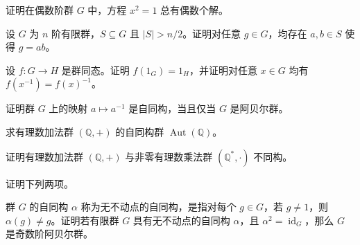 \noindent\begin{minipage}{\textwidth}
证明在偶数阶群 $G$ 中，方程 $x^{2}=1$ 总有偶数个解。
\end{minipage}\par\vfill
\newpage
\noindent\begin{minipage}{\textwidth}
设 $G$ 为 $n$ 阶有限群，$S\subseteq G$ 且 $|S|>n/2$。证明对任意 $g\in G$，均存在 $a,b\in S$ 使得 $g=ab$。
\end{minipage}\par\vfill
\noindent\begin{minipage}{\textwidth}
设 $f\colon G\to H$ 是群同态。证明 $f(1_G)=1_H$，并证明对任意 $x\in G$ 均有 $f(x^{-1})=f(x)^{-1}$。
\end{minipage}\par\vfill
\noindent\begin{minipage}{\textwidth}
证明群 $G$ 上的映射 $a\mapsto a^{-1}$ 是自同构，当且仅当 $G$ 是阿贝尔群。
\end{minipage}\par\vfill
\newpage
\noindent\begin{minipage}{\textwidth}
求有理数加法群 $(\mathbb{Q},+)$ 的自同构群 $\operatorname{Aut}(\mathbb{Q})$。
\end{minipage}\par\vfill
\noindent\begin{minipage}{\textwidth}
证明有理数加法群 $(\mathbb{Q},+)$ 与非零有理数乘法群 $(\mathbb{Q}^{*},\cdot)$ 不同构。
\end{minipage}\par\vfill
\noindent\begin{minipage}{\textwidth}
证明下列两项。
\end{minipage}\par\vfill
\newpage
\noindent\begin{minipage}{\textwidth}
群 $G$ 的自同构 $\alpha$ 称为无不动点的自同构，是指对每个 $g\in G$，若 $g\ne 1$，则 $\alpha(g)\ne g$。证明若有限群 $G$ 具有无不动点的自同构 $\alpha$，且 $\alpha^2=\operatorname{id}_{G}$，那么 $G$ 是奇数阶阿贝尔群。
\end{minipage}\par\vfill

